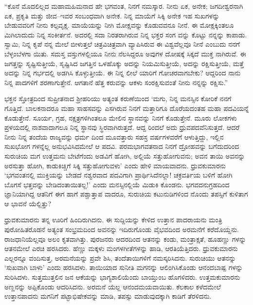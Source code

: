 “ಕೊನೆ ಮೊದಲಿಲ್ಲದ ಮಹಾಮಹಿಮನಾದ ಹೇ ಭಗವಂತ, ನಿನಗೆ ನಮಸ್ಕಾರ. ನೀನು ಏಕ, ಅನೇಕ; ಜಗದೀಶ್ವರನಾಗಿ ಏಕ, ಪ್ರಕೃತಿ ಮತ್ತು ಜೀವ–ಇವರ ಸಂಬಂಧವಾಗಿ ಅನೇಕ. ನಿನ್ನ ಮಾಯೆಗೆ ಸಿಕ್ಕಿ ಅನೇಕ ಇಹ ಸುಖಗಳನ್ನು ಬೇಡುವವರಿಗೆ ನೀನು ಕಲ್ಪವೃಕ್ಷ. ಮಾಯೆಯನ್ನು ನೀಗಿ ಮೋಕ್ಷವನ್ನು ಕೊಡುವವನೂ ನೀನೆ. ಈ ಮೋಕ್ಷಕ್ಕಿಂತಲೂ ಮಿಗಿಲಾದುದು ನಿನ್ನ ಸಂಕೀರ್ತನೆ. ಅದರಲ್ಲಿ ಸದಾ ನಿರತರಾಗಿರುವ ನಿನ್ನ ಭಕ್ತರ ಸಂಗ ವನ್ನು ಕೊಟ್ಟು ನನ್ನನ್ನು ಕಾಪಾಡು. ಸ್ವಾಮಿ, ನಿನ್ನ ಕೃಪೆ ನನ್ನ ಮೇಲೆ ಬೀಳುತ್ತಲೆ ಚಿತ್ರವಿಚಿತ್ರವಾಗಿ ವ್ಯಾಪಿಸಿರುವ ಈ ವಿಶ್ವವೆಲ್ಲವೂ ನೀನೆ ಎಂಬುದು ನನಗೆ ಬೆಳ್ಳಂಬೆಳಗಾ ಯಿತು. ಸಮಸ್ತ ವಸ್ತುಗಳಲ್ಲಿಯೂ ನೀನು ನೆಲಸಿದ್ದರೂ ಅವುಗಳ ದೋಷಕ್ಕೆ ಸಿಕ್ಕದೆ ಮುಕ್ತ ನಾಗಿರುವೆ. ಈ ಜಗತ್ತನ್ನು ಸೃಷ್ಟಿಸುತ್ತೀಯೆ, ಸೃಷ್ಟಿಸಿದ ಜಗತ್ತಿನ ಒಳಹೊಕ್ಕು ಅದನ್ನು ನಿಯಮಿಸುತ್ತೀಯೆ, ಅದನ್ನು ರಕ್ಷಿಸುತ್ತೀಯೆ, ಮತ್ತೆ ಅದನ್ನು ನಿನ್ನ ಗರ್ಭದಲ್ಲಿ ಅಡಗಿಸಿ ಕೊಳ್ಳುತ್ತೀಯೆ. ಈ ನಿನ್ನ ಲೀಲೆ ಯಾರಿಗೆ ಗೋಚರವಾಗಬೇಕು? ಆದ್ದರಿಂದ ನಾನು ನಿನ್ನ ಪಾದಗಳಿಗೆ ಶರಣಾಗುತ್ತೇನೆ. ಆಗತಾನೆ ಹೆತ್ತ ಕರುವನ್ನು ಆಕಳು ಸಂರಕ್ಷಿಸುವಂತೆ ನೀನು ನನ್ನನ್ನು ರಕ್ಷಿಸು.”

ಭಕ್ತನ ಸ್ತೋತ್ರದಿಂದ ಸುಪ್ರೀತನಾದ ಶ್ರೀಹರಿಯು ಅತ್ಯಂತ ಕರುಣೆಯಿಂದ ‘ಮಗು, ನಿನ್ನ ಮನಸ್ಸಿನ ಕೋರಿಕೆ ನನಗೆ ಗೊತ್ತಿದೆ. ಬಾಲಕನಾದರೂ ಮಹಾ ಸಾಹಸವನ್ನು ಎಸಗಿರುವ ನಿನಗೆ ಮತ್ತಾರಿಗೂ ದೊರೆಯದಂತಹ ಮಹಾ ಪದವಿಯನ್ನೆ ಕೊಡುತ್ತೇನೆ. ಸೂರ್ಯ, ಗ್ರಹ, ನಕ್ಷತ್ರಗಳಿಗಿಂತಲೂ ಮೇಲಿನ ಸ್ಥಾನವನ್ನು ನಿನಗೆ ಕೊಡುತ್ತೇನೆ. ಮೂರು ಲೋಕಗಳು ಪ್ರಳಯದಲ್ಲಿ ನಾಶವಾದಾಗಲೂ ನಿನ್ನ ಸ್ಥಾನವು ಸ್ಥಿರವಾಗಿರುತ್ತದೆ. ಆದ್ದ ರಿಂದಲೆ ಅದು ಧ್ರುವಪದವೆನಿಸುತ್ತದೆ. ಆದರೆ ನೀನು ನಿನ್ನ ತಂದೆಯ ರಾಜ್ಯವನ್ನು ಧರ್ಮ ದಿಂದ ಮೂವತ್ತಾರು ಸಹಸ್ರ ವರ್ಷಗಳವರೆಗೆ ಆಳುತ್ತಿದ್ದು, ಇಲ್ಲಿನ ಸುಖಭೋಗ ಗಳನ್ನೆಲ್ಲ ಅನುಭವಿಸಿದಮೇಲೆ ಆ ಪದವಿ. ಪರಮಭಾಗವತನಾದ ನಿನಗೆ ದ್ರೋಹವನ್ನು ಬಗೆದುದರಿಂದ ಸುರುಚಿಯ ಮಗ ಉತ್ತಮನು ಬೇಟೆಗೆಂದು ಅಡವಿಗೆ ಹೋಗಿ, ಅಲ್ಲಿಯೆ ಸತ್ತುಹೋಗುವನು; ಅವನ ತಾಯಿ ಅವನನ್ನು ಅರಸುತ್ತಾ ಹೋಗಿ, ಕಾಡುಕಿಚ್ಚಿಗೆ ಸಿಕ್ಕಿ ಸತ್ತುಹೋಗುವಳು’ ಎಂದು ಹೇಳಿ ಮಾಯವಾದನು. ಧ್ರುವಕುಮಾರನು ‘ಭಗವಂತನಲ್ಲಿ ಮುಕ್ತಿಯನ್ನು ಬೇಡದೆ ನಶ್ವರವಾದ ಪದವಿಗಾಗಿ ಪ್ರಾರ್ಥಿಸಿದೆನಲ್ಲಾ! ಚಕ್ರವರ್ತಿಯ ಬಳಿಗೆ ಹೋಗಿ ಬೊಗಸೆ ಭತ್ತವನ್ನು ಬೇಡಿದಂತಾಯಿತಲ್ಲ!’ ಎಂದು ಮನಸ್ಸಿನಲ್ಲಿಯೆ ಮಿಡುಕಿ ಕೊಂಡನು. ಭಗವದನುಗ್ರಹದಿಂದ ಜ್ಞಾನಿಯಾಗಿದ್ದ ಆತನಿಗೆ ಈಗ ಹಾಗೆ ಪಶ್ಚಾತ್ತಾಪ ವಾದರೂ, ಸುರುಚಿಯ ಕಟುನುಡಿಗಳಿಂದ ನೊಂದು ತಪಸ್ಸಿಗೆ ಕುಳಿತಾಗ ಆ ಭಾವನೆ ಯೆಲ್ಲಿತ್ತು?

ಧ್ರುವಕುಮಾರನು ತನ್ನ ಊರಿಗೆ ಹಿಂದಿರುಗಿದನು. ಈ ಸುದ್ದಿಯನ್ನು ಕೇಳಿದ ಉತ್ತಾನ ಪಾದರಾಯನು ಮಂತ್ರಿ ಪುರೋಹಿತರೊಡನೆ ಅತ್ಯಂತ ಸಂಭ್ರಮದಿಂದ ಅವನನ್ನು ಇದಿರುಗೊಂಡು ವೈಭವದಿಂದ ಅರಮನೆಗೆ ಕರೆದೊಯ್ದನು. ರಾಜಧಾನಿಯೆಲ್ಲವೂ ಅಲಂ ಕೃತವಾಗಿತ್ತು. ಪುರಜನರು ಆದರದಿಂದ ಆತನನ್ನು ಕಂಡು, ಮಂತ್ರಾಕ್ಷತೆ, ಹೂಹಣ್ಣು ಗಳನ್ನು ಆತನಮೇಲೆ ಎರಚಿ ಹರಸಿದರು. ಹೆಣ್ಣು ಮಕ್ಕಳು ಮಂಗಳಗೀತೆಗಳನ್ನು ಹಾಡಿ, ಆರತಿಯೆತ್ತಿದರು. ಧ್ರುವಕುಮಾರನು ಎಲ್ಲರನ್ನೂ ವಂದಿಸುತ್ತ, ಅರಮನೆಯನ್ನು ಪ್ರವೇ ಶಿಸಿ, ತಂದೆತಾಯಿಗಳಿಗೆ ನಮಸ್ಕರಿಸಿದನು. ಸುರುಚಿಯು ಆತನನ್ನು ‘ಸುಖವಾಗಿ ಬಾಳು’ ಎಂದು ಹರಸಿದಳು. ತಾಯಿಯಾದ ಸುನೀತಿ ಮಗನನ್ನು ಆಲಿಂಗಿಸಿಕೊಂಡು ಆನಂದಬಾಷ್ಪ ಗಳನ್ನು ಸುರಿಸಿದಳು. ಸುತ್ತಮುತ್ತಲಿನ ಜನ ಆಕೆಯನ್ನು ಭಾಗ್ಯಶಾಲಿಯೆಂದು ಬಾಯ್ತುಂಬ ಹೊಗಳಿದರು. ಉತ್ತಮಕುಮಾರನು ಅಣ್ಣನನ್ನು ಅಪ್ಪಿಕೊಂಡು ಆದರಿಸಿದನು. ಅರಮನೆ ಯೆಲ್ಲ ಆನಂದಮಯವಾಯಿತು. ಕೆಲಕಾಲ ಕಳೆದಮೇಲೆ ಉತ್ತಾನಪಾದನು ಮಗನಿಗೆ ಪಟ್ಟಾಭಿಷೇಕವನ್ನು ಮಾಡಿ, ತಪಸ್ಸು ಮಾಡುವುದಕ್ಕಾಗಿ ಕಾಡಿಗೆ ತೆರಳಿದನು.

